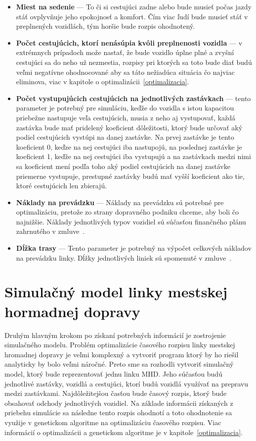 \begin{itemize}
  \item \textbf{Miest na sedenie} --- To či si cestujúci zadne alebo bude musieť počas jazdy stáť ovplyvňuje jeho spokojnosť a komfort. Čím viac ľudí bude musieť stáť v preplnených vozidlách, tým horšie bude rozpis ohodnotený.
  \item \textbf{Počet cestujúcich, ktorí nenásúpia kvôli preplnenosti vozidla} --- v extrémnych prípadoch može nastať, že bude vozidlo úplne plné a zvyšní cestujúci sa do neho už nezmestia, rozpisy pri ktorých sa toto bude diať budú veľmi negatívne ohodnocované aby sa táto nežiadúca situácia čo najviac eliminova, viac v kapitole o optimalizácii~\ref{optimalizacia}.
  \item \textbf{Počet vystupujúcich cestujúcich na jednotlivých zastávkach} --- tento parameter je potrebný pre simuláciu, keďže do vozidla s istou kapacitou priebežne nastupuje veľa cestujúcich, musia z neho aj vystupovať, každá zastávka bude mať pridelený koeficient dôležitosti, ktorý bude určovať aký podiel cestujúcich vystúpi na danej zastávke. Na prvej zastávke je tento koeficient 0, keďze na nej cestujúci iba nastupojú, na poslednej zastávke je koeficient 1, keďže na nej cestujúci iba vystupujú a na zastávkach medzi nimi sa koeficient mení podľa toho aký podiel cestujúcich na danej zastávke priemerne vystupuje, prestupné zastávky budú mať vyšší koeficient ako tie, ktoré cestujúcich len zbierajú.
  \item \textbf{Náklady na prevádzku} --- Náklady na prevádzku sú potrebné pre optimalizáciu, pretože zo strany dopravného podniku chceme, aby boli čo najnižšie. Náklady jednotlivých typov vozidiel sú súčasťou finančného plánu zahrnutého v zmluve~\cite{brno_dpmb_smlouva_2023}.
  \item \textbf{Dĺžka trasy} --- Tento parameter je potrebný na výpočet celkových nákladov na prevádzku linky. Dĺžky jednotlivých liniek sú spomenuté v zmluve~\cite{brno_dpmb_smlouva_2023}.
\end{itemize}

\chapter{Simulačný model linky mestskej hormadnej dopravy}\label{simulacny_model}

Druhým hlavným krokom po získaní potrebných informácií je zostrojenie simulačného modelu.
Problém optimalizácie časového rozpisu linky mestskej hromadnej dopravy je veľmi komplexný a vytvoriť program ktorý by ho riešil analyticky by bolo veľmi náročné.
Preto sme sa rozhodli vytvoriť simulačný model, ktorý bude reprezentovať jednu linku MHD.
Jeho súčasťou budú jednotlivé zastávky, vozidlá a cestujúci, ktorí budú vozidlá využívať na prepravu medzi zastávkami.
Najdôležitejšou časťou bude časový rozpis, ktorý bude obsahovať odchody jednotlivých vozidiel.
Na základe informácii získaných z priebehu simulácie sa následne tento rozpis ohodnotí a toto ohodnotenie sa využije v genetickom algoritme na optimalizáciu časového rozpisu.
Viac informácií o optimalizácii a genetickom algoritme je v kapitole~\ref{optimalizacia}.

